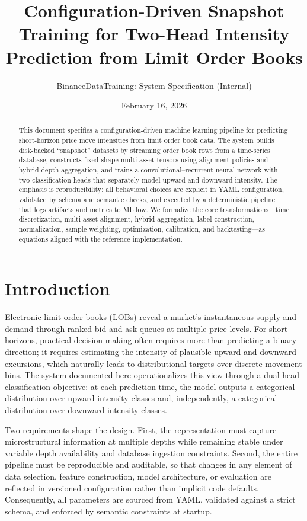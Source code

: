 \documentclass[11pt]{article}
\title{Configuration-Driven Snapshot Training for Two-Head Intensity Prediction from Limit Order Books}
\author{BinanceDataTraining: System Specification (Internal)}
\date{February 16, 2026}
\begin{document}
\maketitle

\begin{abstract}
This document specifies a configuration-driven machine learning pipeline for predicting short-horizon price move intensities from limit order book data. The system builds disk-backed ``snapshot'' datasets by streaming order book rows from a time-series database, constructs fixed-shape multi-asset tensors using alignment policies and hybrid depth aggregation, and trains a convolutional--recurrent neural network with two classification heads that separately model upward and downward intensity. The emphasis is reproducibility: all behavioral choices are explicit in YAML configuration, validated by schema and semantic checks, and executed by a deterministic pipeline that logs artifacts and metrics to MLflow. We formalize the core transformations---time discretization, multi-asset alignment, hybrid aggregation, label construction, normalization, sample weighting, optimization, calibration, and backtesting---as equations aligned with the reference implementation.
\end{abstract}

\section{Introduction}

Electronic limit order books (LOBs) reveal a market's instantaneous supply and demand through ranked bid and ask queues at multiple price levels. For short horizons, practical decision-making often requires more than predicting a binary direction; it requires estimating the intensity of plausible upward and downward excursions, which naturally leads to distributional targets over discrete movement bins. The system documented here operationalizes this view through a dual-head classification objective: at each prediction time, the model outputs a categorical distribution over upward intensity classes and, independently, a categorical distribution over downward intensity classes.

Two requirements shape the design. First, the representation must capture microstructural information at multiple depths while remaining stable under variable depth availability and database ingestion constraints. Second, the entire pipeline must be reproducible and auditable, so that changes in any element of data selection, feature construction, model architecture, or evaluation are reflected in versioned configuration rather than implicit code defaults. Consequently, all parameters are sourced from YAML, validated against a strict schema, and enforced by semantic constraints at startup.
\end{document}
